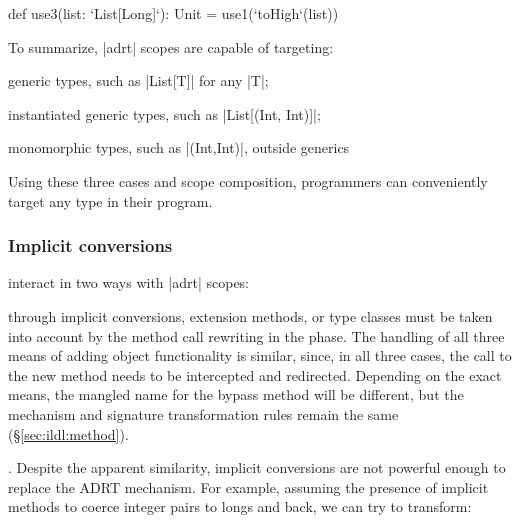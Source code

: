 \begin{lstlisting-nobreak}
def use3(list: `List[Long]`): Unit = use1(`toHigh`(list))
\end{lstlisting-nobreak}

To summarize, |adrt| scopes are capable of targeting:

\vspace{0.3em}
\begin{compactitem}
\item generic types, such as |List[T]| for any |T|;
\item instantiated generic types, such as |List[(Int, Int)]|;
\item monomorphic types, such as |(Int,Int)|, outside generics
\end{compactitem}
\vspace{0.3em}

\noindent
Using these three cases and scope composition, programmers can conveniently target any type in their program.

\subsubsection{Implicit conversions}
\label{sec:ildl:language-implicit-conversions}
interact in two ways with |adrt| scopes:

\vspace{0.3em}
\noindent
{} through implicit conversions, extension methods, or type classes must be taken into account by the method call rewriting in the \coerce{} phase. The handling of all three means of adding object functionality is similar, since, in all three cases, the call to the new method needs to be intercepted and redirected. Depending on the exact means, the mangled name for the bypass method will be different, but the mechanism and signature transformation rules remain the same (\S\ref{sec:ildl:method}).

\vspace{0.3em}
\noindent
{}. Despite the apparent similarity, implicit conversions are not powerful enough
to replace the ADRT mechanism. For example, assuming the presence of implicit methods to coerce integer pairs to longs and back, we can try to transform:

